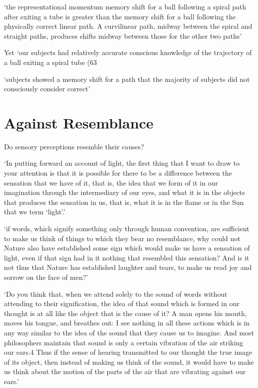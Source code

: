 \documentclass[12pt]{extarticle}
\begin{document}
\begin{multicols*}{3}
‘the representational momentum memory shift for a ball following a spiral path after exiting a tube is greater than the memory shift for a ball following the physically correct linear path. A curvilinear path, midway between the spiral and straight paths, produces shifts midway between those for the other two paths’
\citep[p.~975]{freyd:1994_representational}
 
Yet ‘our subjects had relatively accurate conscious knowledge of the trajectory of a ball exiting 
a spiral tube (63%
\citep[p.~975]{freyd:1994_representational}
 
‘subjects showed a memory shift for a path that the majority of subjects did not consciously consider correct’
\citep[p.~975]{freyd:1994_representational}
 
\section{Against Resemblance}
 
Do sensory perceptions resemble their causes?
 
‘In putting forward an account of light, the first thing that I want to draw to your attention 
is that it is possible for there to be a difference between the sensation that we have of it, 
that is, the idea that we form of it in our imagination through the intermediary of our eyes, 
and what it is in the objects that produces the sensation in us, that is, what it is in the flame 
or in the Sun that we term ‘light’.’
\citep[][p. 3 (AT 3)]{descartes:1998_world}
 
‘if words, which signify something only through human convention, are sufficient to make us think of
things to which they bear no resemblance, why could not Nature also have established some sign
which would make us have a sensation of light, even if that sign had in it nothing that resembled
this sensation? And is it not thus that Nature has established laughter and tears, to make us read
joy and sorrow on the face of men?’
\citep[][p. 4 (AT 4)]{descartes:1998_world}
 
‘Do you think that, when we attend solely to the sound of words without attending to their
signification, the idea of that sound which is formed in our thought is at all like the object that
is the cause of it? A man opens his mouth, moves his tongue, and breathes out: I see nothing in all
these actions which is in any way similar to the idea of the sound that they cause us to imagine.
And most philosophers maintain that sound is only a certain vibration of the air striking our ears.4
Thus if the sense of hearing transmitted to our thought the true image of its object, then instead
of making us think of the sound, it would have to make us think about the motion of the parts of the
air that are vibrating against our ears.’
\citep[][p. 4--5 (AT 5)]{descartes:1998_world}
 

\end{multicols*}
\end{document}
